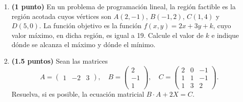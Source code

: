 
\begin{enumerate}[label=\alph*)]
\item \textbf{(1 punto)} En un problema de programación lineal, la región factible es la región acotada cuyos vértices son $A(2,-1)$, $B(-1,2)$, $C(1,4)$ y $D(5,0)$. La función objetivo es la función $f(x,y)=2x+3y+k$, cuyo valor máximo, en dicha región, es igual a 19. Calcule el valor de $k$ e indique dónde se alcanza el máximo y dónde el mínimo.
\item \textbf{(1.5 puntos)} Sean las matrices
\[
A=\begin{pmatrix}1&-2&3\end{pmatrix},\quad
B=\begin{pmatrix}2\\-1\\1\end{pmatrix},\quad
C=\begin{pmatrix}2&0&-1\\1&1&-1\\1&3&2\end{pmatrix}.
\]
Resuelva, si es posible, la ecuación matricial $B\cdot A+2X=C$.
\end{enumerate}
